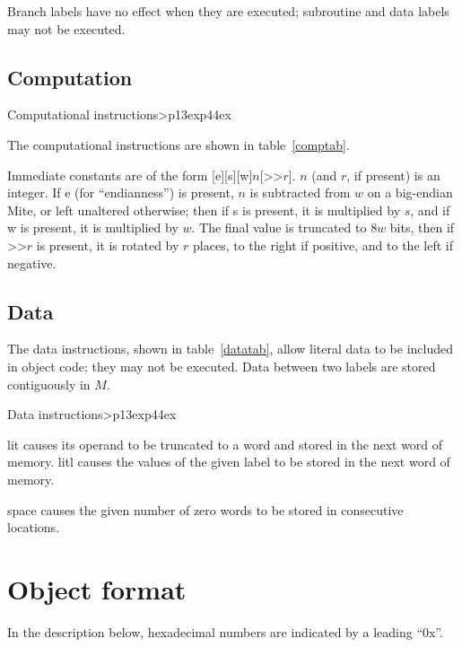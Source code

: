 \documentclass[english]{scrartcl}
\newcommand{\synfont}{\sffamily}
\newcommand{\syn}[1]{{\synfont #1}}
\newenvironment{insttab}[1]
    {\begin{ctable}{#1}{>{\synfont}p{13ex}p{44ex}}\toprule}
    {\bottomrule\end{ctable}}
\begin{document}
Branch labels have no effect when they are executed; subroutine and data
labels may not be executed.


\subsection{Computation}

\begin{insttab}{Computational instructions\label{comptab}}

\end{insttab}

The computational instructions are shown in table~\ref{comptab}.

Immediate constants are of the form
[\syn{e}][\syn{s}][\syn{w}]$n$[\syn{>\/>}$r$]. $n$ (and $r$, if present) is
an integer. If \syn{e} (for ``endianness'') is present, $n$ is subtracted
from $w$ on a big-endian Mite, or left unaltered otherwise; then if \syn{s}
is present, it is multiplied by $s$, and if \syn{w} is present, it is
multiplied by $w$. The final value is truncated to $8w$ bits, then if
\syn{>\/>}$r$ is present, it is rotated by $r$ places, to the right if
positive, and to the left if negative.


\subsection{Data}

The data instructions, shown in table~\ref{datatab}, allow literal data to
be included in object code; they may not be executed. Data between two
labels are stored contiguously in $M$.

\begin{insttab}{Data instructions\label{datatab}}

\end{insttab}

\syn{lit} causes its operand to be truncated to a word and stored in the
next word of memory. \syn{litl} causes the values of the given label to be
stored in the next word of memory.

\syn{space} causes the given number of zero words to be stored in
consecutive locations.



\section{Object format}

In the description below, hexadecimal numbers are indicated by a leading
``0x''.
\end{document}
